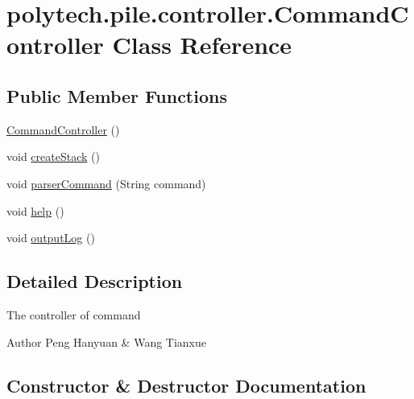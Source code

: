\hypertarget{classpolytech_1_1pile_1_1controller_1_1_command_controller}{}\section{polytech.\+pile.\+controller.\+Command\+Controller Class Reference}
\label{classpolytech_1_1pile_1_1controller_1_1_command_controller}
\subsection*{Public Member Functions}
\begin{DoxyCompactItemize}
\item 
\hyperlink{classpolytech_1_1pile_1_1controller_1_1_command_controller_a8ed2ab01af9d496201b9a2be0df2a9f6}{Command\+Controller} ()
\item 
void \hyperlink{classpolytech_1_1pile_1_1controller_1_1_command_controller_a8325e47840b45543564efa453d77d4b0}{create\+Stack} ()
\item 
void \hyperlink{classpolytech_1_1pile_1_1controller_1_1_command_controller_a526c1cca589e31c4be31059e0a48fe09}{parser\+Command} (String command)
\item 
void \hyperlink{classpolytech_1_1pile_1_1controller_1_1_command_controller_adfc3719a4a015a6d19debda1db443d46}{help} ()
\item 
void \hyperlink{classpolytech_1_1pile_1_1controller_1_1_command_controller_a8b23ab89dde1b77aa64848af6d1f6880}{output\+Log} ()
\end{DoxyCompactItemize}


\subsection{Detailed Description}
The controller of command

\begin{DoxyAuthor}{Author}
Peng Hanyuan \& Wang Tianxue 
\end{DoxyAuthor}


\subsection{Constructor \& Destructor Documentation}
\hypertarget{classpolytech_1_1pile_1_1controller_1_1_command_controller_a8ed2ab01af9d496201b9a2be0df2a9f6}{}\label{classpolytech_1_1pile_1_1controller_1_1_command_controller_a8ed2ab01af9d496201b9a2be0df2a9f6} 
